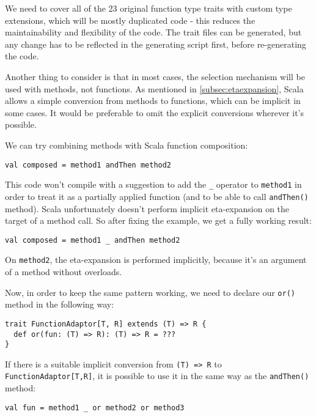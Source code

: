 We need to cover all of the 23 original function type traits with custom type extensions, which will be mostly duplicated code - this reduces the maintainability and flexibility of the code. The trait files can be generated, but any change has to be reflected in the generating script first, before re-generating the code.

Another thing to consider is that in most cases, the selection mechanism will be used with methods, not functions. As mentioned in \ref{subsec:etaexpansion}, Scala allows a simple conversion from methods to functions, which can be implicit in some cases. It would be preferable to omit the explicit conversions wherever it's possible.

We can try combining methods with Scala function composition:
\lstset{style=Scala}
\begin{lstlisting}
val composed = method1 andThen method2
\end{lstlisting}

This code won't compile with a suggestion to add the \lstinline|_| operator to \lstinline|method1| in order to treat it as a partially applied function (and to be able to call \lstinline|andThen()| method). Scala unfortunately doesn't perform implicit eta-expansion on the target of a method call. So after fixing the example, we get a fully working result:

\lstset{style=Scala}
\begin{lstlisting}
val composed = method1 _ andThen method2
\end{lstlisting}

On \lstinline|method2|, the eta-expansion is performed implicitly, because it's an argument of a method without overloads.

Now, in order to keep the same pattern working, we need to declare our \lstinline|or()| method in the following way:
\lstset{style=Scala}
\begin{lstlisting}
trait FunctionAdaptor[T, R] extends (T) => R {
  def or(fun: (T) => R): (T) => R = ???
}
\end{lstlisting}

If there is a suitable implicit conversion from \lstinline|(T) => R| to \lstinline|FunctionAdaptor[T,R]|, it is possible to use it in the same way as the \lstinline|andThen()| method:

\lstset{style=Scala}
\begin{lstlisting}
val fun = method1 _ or method2 or method3
\end{lstlisting}

